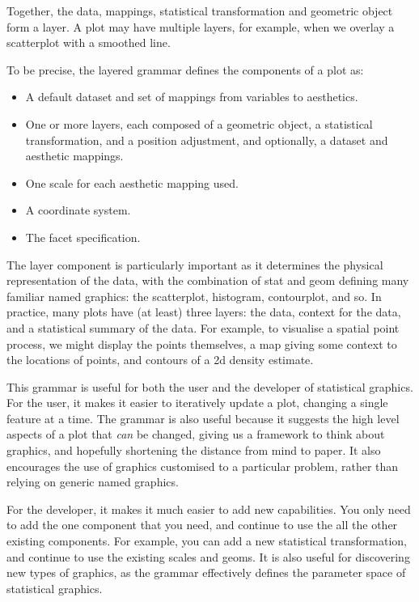 \noindent Together, the data, mappings, statistical transformation and geometric object form a layer.  A plot may have multiple layers, for example, when we overlay a scatterplot with a smoothed line.

To be precise, the layered grammar defines the components of a plot as:

\begin{itemize}
  \item A default dataset and set of mappings from variables to aesthetics.
  \item One or more layers, each composed of a geometric object, a statistical transformation, and a position adjustment, and optionally, a dataset and aesthetic mappings.
  \item One scale for each aesthetic mapping used.
  \item A coordinate system.
  \item The facet specification.
\end{itemize}


The layer component is particularly important as it determines the physical representation of the data, with the combination of stat and geom defining many familiar named graphics: the scatterplot, histogram, contourplot, and so.  In practice, many plots have (at least) three layers: the data, context for the data, and a statistical summary of the data.  For example, to visualise a  spatial point process, we might display the points themselves, a map giving some context to the locations of points, and contours of a 2d density estimate.

This grammar is useful for both the user and the developer of statistical graphics.  For the user, it makes it easier to iteratively update a plot, changing a single feature at a time.  The grammar is also useful because it suggests the high level aspects of a plot that \emph{can} be changed, giving us a framework to think about graphics, and hopefully shortening the distance from mind to paper.  It also encourages the use of graphics customised to a particular problem, rather than relying on generic named graphics.

For the developer, it makes it much easier to add new capabilities. You only need to add the one component that you need, and continue to use the all the other existing components.  For example, you can add a new statistical transformation, and continue to use the existing scales and geoms.  It is also useful for discovering new types of graphics, as the grammar effectively defines the parameter space of statistical graphics.

